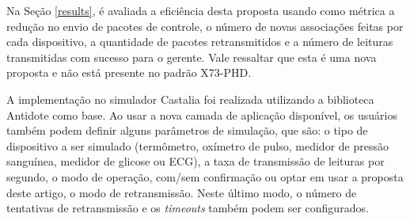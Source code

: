 Na Seção \ref{results}, é avaliada a eficiência desta proposta usando como métrica a redução no envio de pacotes de controle, o número de novas associações feitas por cada dispositivo, a quantidade de pacotes retransmitidos e a número de leituras transmitidas com sucesso para o gerente. Vale ressaltar que esta é uma nova proposta e não está presente no padrão X73-PHD.

A implementação no simulador Castalia foi realizada utilizando a biblioteca Antidote \cite{b20} como base. Ao usar a nova camada de aplicação disponível, os usuários também podem definir alguns parâmetros de simulação, que são: o tipo de dispositivo a ser simulado (termômetro, oxímetro de pulso, medidor de pressão sanguínea, medidor de glicose ou ECG), a taxa de transmissão de leituras por segundo, o modo de operação, com/sem confirmação ou optar em usar a proposta deste artigo, o modo de retransmissão.  Neste último modo, o número de tentativas de retransmissão e os \textit{timeouts} também podem ser configurados.
